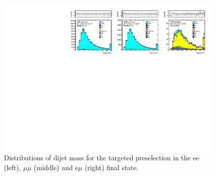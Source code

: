 \clearpage

\begin{figure}[hbt]
  \begin{center}
	\includegraphics[width=1.0\linewidth]{plots/mjj_92fb.pdf}
	\caption{
	  \label{fig:mjj}\protect 
Distributions of dijet mass for the targeted preselection in the ee (left), $\mu\mu$ (middle) and e$\mu$ (right) final state.
}                   
  \end{center}
\end{figure}





